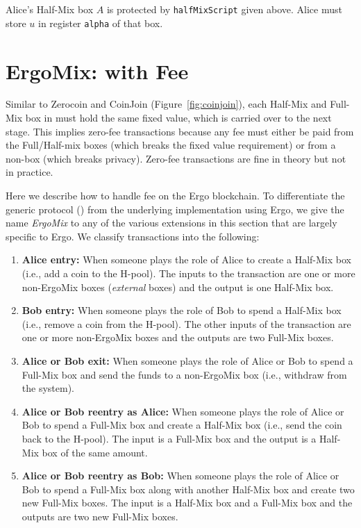 \documentclass[runningheads]{llncs}
\newcommand{\mixname}{ErgoMix\xspace}
\begin{document}
Alice's Half-Mix box $A$ is protected by \texttt{halfMixScript} given above. Alice must store $u$ in register \texttt{alpha} of that box.


\section{\mixname: \algname with Fee}
\label{fee}

Similar to Zerocoin and CoinJoin (Figure~\ref{fig:coinjoin}), each Half-Mix and Full-Mix box in \algname must hold the same fixed value, which is carried over to the next stage. This implies zero-fee transactions because any fee must either be paid from the Full/Half-mix boxes (which breaks the fixed value requirement) or from a non-\algname box (which breaks privacy). Zero-fee transactions are fine in theory but not in practice. %

Here we describe how to handle fee on the Ergo blockchain. To differentiate the generic protocol (\algname) from the underlying implementation using Ergo, we give the name {\em \mixname} to any of the various extensions in this section that are largely specific to Ergo. 
We classify \algname transactions into the following:

\begin{enumerate}
    \item \textbf{Alice entry:} When someone plays the role of Alice to create a Half-Mix box (i.e., add a coin to the H-pool). The inputs to the transaction are one or more non-\mixname boxes ({\em external} boxes) and the output is one Half-Mix box. 
    \item \textbf{Bob entry:} When someone plays the role of Bob to spend a Half-Mix box (i.e., remove a coin from the H-pool). The other inputs of the transaction are one or more non-\mixname boxes and the outputs are two Full-Mix boxes. 
    \item \textbf{Alice or Bob exit:} When someone plays the role of Alice or Bob to spend a Full-Mix box and send the funds to a non-\mixname box (i.e., withdraw from the system). 
    \item \textbf{Alice or Bob reentry as Alice:} When someone plays the role of Alice or Bob to spend a Full-Mix box and create a Half-Mix box (i.e., send the coin back to the H-pool). The input is a Full-Mix box and the output is a Half-Mix box of the same amount.
    \item \textbf{Alice or Bob reentry as Bob:} When someone plays the role of Alice or Bob to spend a Full-Mix box along with another Half-Mix box and create two new Full-Mix boxes. The input is a Half-Mix box and a Full-Mix box and the outputs are two new Full-Mix boxes.
\end{enumerate}
\end{document}
